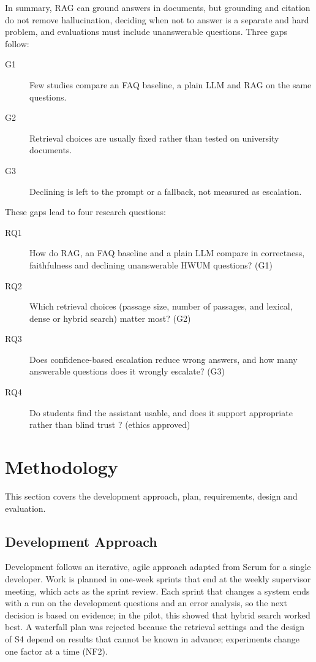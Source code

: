 \documentclass[12pt,nonacm,acmlarge,titlepage,screen]{acmart}
\begin{document}
In summary, RAG can ground answers in documents, but grounding and citation do not remove hallucination, deciding when not to answer is a separate and hard problem, and evaluations must include unanswerable questions. Three gaps follow:
\begin{description}
  \item[G1] Few studies compare an FAQ baseline, a plain LLM and RAG on the same questions.
  \item[G2] Retrieval choices are usually fixed rather than tested on university documents.
  \item[G3] Declining is left to the prompt or a fallback, not measured as escalation.
\end{description}
These gaps lead to four research questions:
\begin{description}
  \item[RQ1] How do RAG, an FAQ baseline and a plain LLM compare in correctness, faithfulness and declining unanswerable HWUM questions? (G1)
  \item[RQ2] Which retrieval choices (passage size, number of passages, and lexical, dense or hybrid search) matter most? (G2)
  \item[RQ3] Does confidence-based escalation reduce wrong answers, and how many answerable questions does it wrongly escalate? (G3)
  \item[RQ4] Do students find the assistant usable, and does it support appropriate rather than blind trust \cite{lee2004trust}? (ethics approved)
\end{description}

\section{Methodology} \label{cha:method}

This section covers the development approach, plan, requirements, design and evaluation.

\subsection{Development Approach} \label{sec:method_approach}

Development follows an iterative, agile approach adapted from Scrum \cite{schwaber2020scrum} for a single developer. Work is planned in one-week sprints that end at the weekly supervisor meeting, which acts as the sprint review. Each sprint that changes a system ends with a run on the development questions and an error analysis, so the next decision is based on evidence; in the pilot, this showed that hybrid search worked best. A waterfall plan was rejected because the retrieval settings and the design of S4 depend on results that cannot be known in advance; experiments change one factor at a time (NF2).
\end{document}
